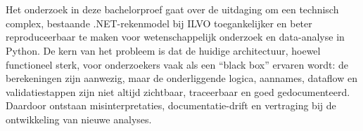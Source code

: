 
%
%
%
%
%

%



\chapter*{}
Het onderzoek in deze bachelorproef gaat over de uitdaging om een technisch complex, bestaande .NET-rekenmodel bij ILVO toegankelijker en beter reproduceerbaar te maken voor wetenschappelijk onderzoek en data-analyse in Python. De kern van het probleem is dat de huidige architectuur, hoewel functioneel sterk, voor onderzoekers vaak als een “black box” ervaren wordt: de berekeningen zijn aanwezig, maar de onderliggende logica, aannames, dataflow en validatiestappen zijn niet altijd zichtbaar, traceerbaar en goed gedocumenteerd. Daardoor ontstaan misinterpretaties, documentatie-drift en vertraging bij de ontwikkeling van nieuwe analyses.

